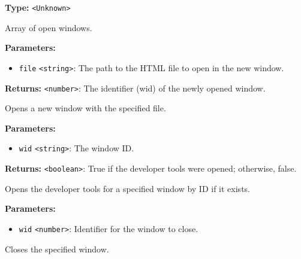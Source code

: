 \documentclass[12pt,a4paper]{article}
\begin{document}
\noindent \textbf{Type:} \texttt{<Unknown>}

\noindent Array of open windows.

\vspace{5mm}
\noindent {}


\noindent \textbf{Parameters:}
\begin{itemize}
  \item \texttt{file} \texttt{<string>}: The path to the HTML file to open in the new window.
\end{itemize}

\noindent \textbf{Returns:} \texttt{<number>}: The identifier (wid) of the newly opened window.

\noindent Opens a new window with the specified file.

\vspace{5mm}
\noindent {}


\noindent \textbf{Parameters:}
\begin{itemize}
  \item \texttt{wid} \texttt{<string>}: The window ID.
\end{itemize}

\noindent \textbf{Returns:} \texttt{<boolean>}: True if the developer tools were opened; otherwise, false.

\noindent Opens the developer tools for a specified window by ID if it exists.

\vspace{5mm}
\noindent {}


\noindent \textbf{Parameters:}
\begin{itemize}
  \item \texttt{wid} \texttt{<number>}: Identifier for the window to close.
\end{itemize}

\noindent Closes the specified window.

\vspace{5mm}
\noindent {}
\end{document}
